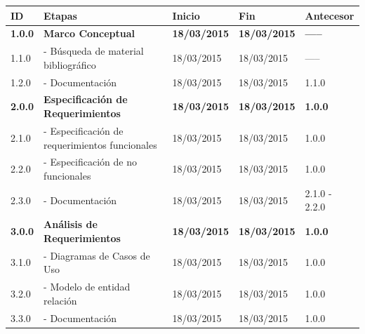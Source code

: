 \documentclass[12pt,letterpaper]{article}
\begin{document}
\begin{table}[htf]
\label{Tabla 2}
\begin{tabular}{| l | p{6cm} | l | l | l |}
\hline

\small{\textbf{ID}} & 
\small{\textbf{Etapas}} & 
\small{\textbf{Inicio}} & 
\small{\textbf{Fin}} & 
\small{\textbf{Antecesor}} \\ \hline

\textbf{\small 1.0.0} & 
\textbf{\small Marco Conceptual} & 
\textbf{\small 18/03/2015} &  
\textbf{\small 18/03/2015} & 
\textbf{\small -----} \\ \hline

\small 1.1.0 & 
\small - Búsqueda de material bibliográfico  & 
\small 18/03/2015 &  
\small 18/03/2015 & 
\small ----- \\ \hline

\small 1.2.0 & 
\small - Documentación & 
\small 18/03/2015 &  
\small 18/03/2015 & 
\small 1.1.0 \\ \hline

\textbf{\small 2.0.0} & 
\textbf{\small Especificación de Requerimientos} & 
\textbf{\small 18/03/2015} &  
\textbf{\small 18/03/2015} & 
\textbf{\small 1.0.0} \\ \hline

\small 2.1.0 & 
\small - Especificación de requerimientos funcionales  & 
\small 18/03/2015 &  
\small 18/03/2015 & 
\small 1.0.0 \\ \hline

\small 2.2.0 & 
\small - Especificación de no funcionales  & 
\small 18/03/2015 &  
\small 18/03/2015 & 
\small 1.0.0 \\ \hline

\small 2.3.0 & 
\small - Documentación & 
\small 18/03/2015 &  
\small 18/03/2015 & 
\small 2.1.0 - 2.2.0 \\ \hline

\textbf{\small 3.0.0} & 
\textbf{\small Análisis de Requerimientos} & 
\textbf{\small 18/03/2015} &  
\textbf{\small 18/03/2015} & 
\textbf{\small 1.0.0} \\ \hline

\small 3.1.0 & 
\small - Diagramas de Casos de Uso & 
\small 18/03/2015 &  
\small 18/03/2015 & 
\small 1.0.0 \\ \hline

\small 3.2.0 & 
\small - Modelo de entidad relación & 
\small 18/03/2015 &  
\small 18/03/2015 & 
\small 1.0.0 \\ \hline

\small 3.3.0 & 
\small - Documentación & 
\small 18/03/2015 &  
\small 18/03/2015 & 
\small 1.0.0 \\ \hline


\end{tabular}
\end{table}
\end{document}
